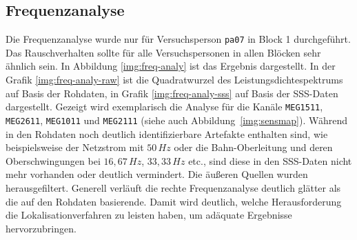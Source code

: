 \documentclass[doc,a4paper,12pt]{apa6}
\begin{document}
\subsection{Frequenzanalyse}
\label{sec:freq-analy}

Die Frequenzanalyse wurde nur für Versuchsperson \texttt{pa07} in Block 1 durchgeführt. Das Rauschverhalten sollte für alle Versuchspersonen in allen Blöcken sehr ähnlich sein. In Abbildung \ref{img:freq-analy} ist das Ergebnis dargestellt. In der Grafik \ref{img:freq-analy-raw} ist die Quadratwurzel des Leistungsdichtespektrums auf Basis der Rohdaten, in Grafik \ref{img:freq-analy-sss} auf Basis der SSS-Daten dargestellt. Gezeigt wird exemplarisch die Analyse für die Kanäle \texttt{MEG1511}, \texttt{MEG2611}, \texttt{MEG1011} und \texttt{MEG2111} (siehe auch Abbildung~\ref{img:sensmap}). Während in den Rohdaten noch deutlich identifizierbare Artefakte enthalten sind, wie beispielsweise der Netzstrom mit $50\,Hz$ oder die Bahn-Oberleitung und deren Oberschwingungen bei $16,67\,Hz$, $33,33\,Hz$ etc., sind diese in den SSS-Daten nicht mehr vorhanden oder deutlich vermindert. Die äußeren Quellen wurden herausgefiltert. Generell verläuft die rechte Frequenzanalyse deutlich glätter als die auf den Rohdaten basierende. Damit wird deutlich, welche Herausforderung die Lokalisationverfahren zu leisten haben, um adäquate Ergebnisse hervorzubringen.
\end{document}
